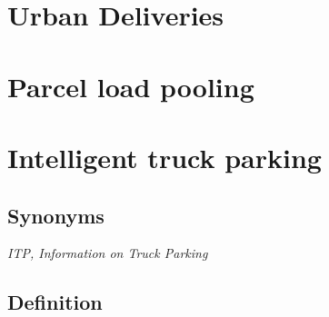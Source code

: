 \documentclass[
]{book}
\begin{document}
\hypertarget{urban_delivery}{%
\section{Urban Deliveries}\label{urban_delivery}}

\hypertarget{parcel_pooling}{%
\section{Parcel load pooling}\label{parcel_pooling}}

\hypertarget{intelligent_truck_park}{%
\section{Intelligent truck parking}\label{intelligent_truck_park}}

\hypertarget{synonyms-18}{%
\subsection*{Synonyms}\label{synonyms-18}}

\emph{ITP, Information on Truck Parking}

\hypertarget{definition-20}{%
\subsection*{Definition}\label{definition-20}}
\end{document}
